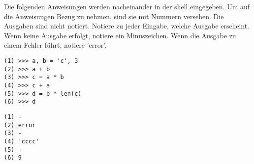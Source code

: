 \question[3]
Die folgenden Anweisungen werden nacheinander in der shell eingegeben. Um auf die Anweisungen Bezug
zu nehmen, sind sie mit Nummern versehen. Die Ausgaben sind nicht notiert.
Notiere zu jeder Eingabe, welche Ausgabe
erscheint. Wenn keine Ausgabe erfolgt, notiere
ein Minuszeichen. Wenn die Ausgabe zu einem Fehler führt, notiere 'error'.

\begin{lstlisting}
(1) >>> a, b = 'c', 3
(2) >>> a + b
(3) >>> c = a * b
(4) >>> c + a
(5) >>> d = b * len(c)
(6) >>> d
\end{lstlisting}
\begin{solutionbox}{5cm}
\begin{lstlisting}
(1) -
(2) error
(3) -
(4) 'cccc'
(5) -
(6) 9
\end{lstlisting}
\end{solutionbox}
